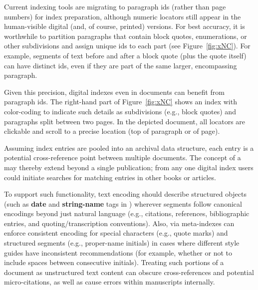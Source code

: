 \documentclass[11pt]{article}
\begin{document}
{{\begin{description}
\clearpage{}



\item[Granular Locators]  Current indexing 
tools are migrating to paragraph ids (rather than page numbers) 
for index preparation, although numeric locators still appear 
in the human-visible digital (and, of course, printed) versions.  
For best accuracy, it is worthwhile to partition paragraphs 
that contain block quotes, enumerations, or other subdivisions 
and assign unique ids to each part (see Figure~\ref{fig:xNC}).  
For example, segments of text before and after a block quote 
(plus the quote itself) can have distinct ids, even if they 
are part of the same larger, encompassing paragraph.

\pseudoIndent{} Given this precision, digital indexes even in \PDF{} documents 
can benefit from paragraph ids.  The right-hand part of 
Figure~\ref{fig:xNC} shows an index with color-coding to 
indicate such details as subdivisions (e.g., block quotes) 
and paragraphs split between two pages.  In the 
depicted document, all locators are clickable and 
scroll to a precise location (top of paragraph or of page).

\item[Bidirectional Indexes and Text Extraction]  Assuming index 
entries are pooled into an archival data structure, each entry 
is a potential cross-reference point between multiple documents.  
The concept of a  may thereby extend beyond a single 
publication; from any one digital index users could initiate 
searches for matching entries in other books or articles.

\pseudoIndent{} To support such functionality, text encoding should describe 
structured objects (such as \textbf{date} and \textbf{string-name} tags in 
\JATS{}) wherever segments follow canonical encodings beyond 
just natural language (e.g., citations, references, bibliographic 
entries, and quoting/transcription conventions).  Also, via \PacTk{} 
meta-indexes can enforce consistent encoding for special characters 
(e.g., quote marks) and structured segments (e.g., proper-name initials) 
in cases where different style guides have inconsistent recommendations 
(for example, whether or not to include spaces between consecutive initials).  
Treating such portions of a document as unstructured text content 
can obscure cross-references and potential micro-citations, 
as well as cause errors within manuscripts internally. 


\end{description}}}
\end{document}
